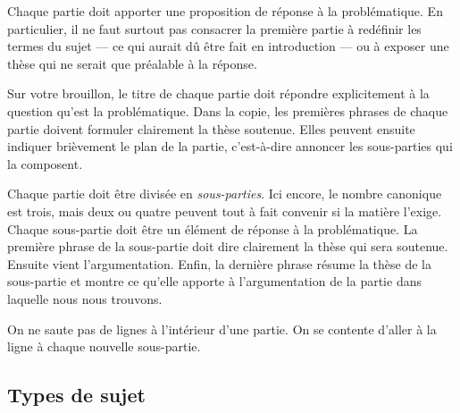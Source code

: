\documentclass[a4paper,11pt]{article}
\begin{document}
\par

Chaque partie doit apporter une proposition de réponse à la
problématique. En particulier, il ne faut surtout pas consacrer la
première partie à redéfinir les termes du sujet --- ce qui aurait dû
être fait en introduction --- ou à exposer une thèse qui ne serait que
préalable à la réponse. 

\par

Sur votre brouillon, le titre de chaque partie doit répondre
explicitement à la question qu'est la problématique. Dans la copie, les
premières phrases de chaque partie doivent formuler clairement la thèse
soutenue. Elles peuvent ensuite indiquer brièvement le plan de la
partie, c'est-à-dire annoncer les sous-parties qui la composent.

\par

Chaque partie doit être divisée en \emph{sous-parties}. Ici encore, le
nombre canonique est trois, mais deux ou quatre peuvent tout à fait
convenir si la matière l'exige. Chaque sous-partie doit être un élément
de réponse à la problématique. La première phrase de la sous-partie doit
dire clairement la thèse qui sera soutenue. Ensuite vient
l'argumentation. Enfin, la dernière phrase résume la thèse de la
sous-partie et montre ce qu'elle apporte à l'argumentation de la partie
dans laquelle nous nous trouvons.

\par

On ne saute pas de lignes à l'intérieur d'une partie. On se contente
d'aller à la ligne à chaque nouvelle sous-partie.


\subsection{Types de sujet}
\end{document}

